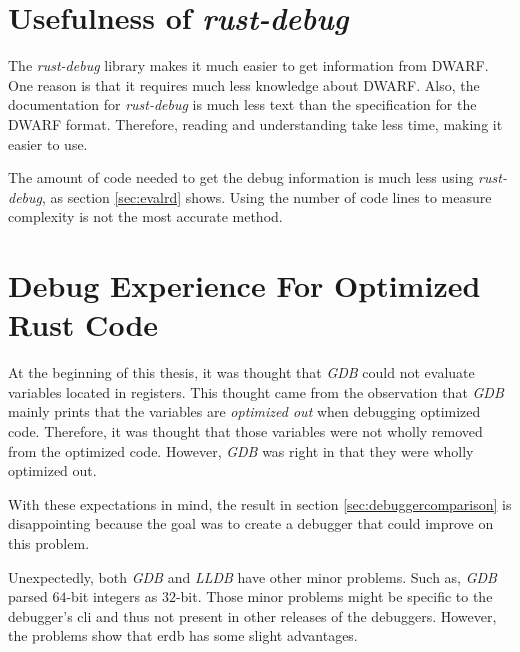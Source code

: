 


\section{Usefulness of \emph{rust-debug}}
The \emph{rust-debug} library makes it much easier to get information from \gls{DWARF}.
One reason is that it requires much less knowledge about \gls{DWARF}.
Also, the documentation for \emph{rust-debug} is much less text than the specification for the \gls{DWARF} format.
Therefore, reading and understanding take less time, making it easier to use.


The amount of code needed to get the debug information is much less using \emph{rust-debug}, as section \ref{sec:evalrd} shows.
Using the number of code lines to measure complexity is not the most accurate method.



\section{Debug Experience For Optimized Rust Code}
At the beginning of this thesis, it was thought that \emph{GDB} could not evaluate variables located in registers.
This thought came from the observation that \emph{GDB} mainly prints that the variables are \emph{optimized out} when debugging optimized code.
Therefore, it was thought that those variables were not wholly removed from the optimized code.
However, \emph{GDB} was right in that they were wholly optimized out.


With these expectations in mind, the result in section \ref{sec:debuggercomparison} is disappointing because the goal was to create a debugger that could improve on this problem.


Unexpectedly, both \emph{GDB} and \emph{LLDB} have other minor problems.
Such as, \emph{GDB} parsed $64$-bit integers as $32$-bit.
Those minor problems might be specific to the debugger's \gls{cli} and thus not present in other releases of the debuggers.
However, the problems show that \gls{erdb} has some slight advantages.



